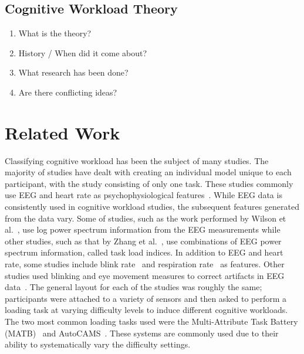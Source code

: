 \documentclass[11pt]{article}
\begin{document}
	\subsection{Cognitive Workload Theory}
	
		\begin{enumerate}
			\item What is the theory?
			\item History / When did it come about?
			\item What research has been done?
			\item Are there conflicting ideas?
		\end{enumerate}

\section{Related Work}
Classifying cognitive workload has been the subject of many studies. The majority of studies have dealt with creating an individual model unique to each participant, with the study consisting of only one task. These studies commonly use EEG and heart rate as psychophysiological features~\cite{Wang_R, Zhang, Wilson, Yang}. While EEG data is consistently used in cognitive workload studies, the subsequent features generated from the data vary. Some of studies, such as the work performed by Wilson et al.~\cite{Wilson}, use log power spectrum information from the EEG measurements while other studies, such as that by Zhang et al.~\cite{Zhang}, use combinations of EEG power spectrum information, called task load indices. In addition to EEG and heart rate, some studies include blink rate~\cite{Wilson, Wilson_2002} and respiration rate~\cite{Wilson_2003} as features. Other studies used blinking and eye movement measures to correct artifacts in EEG data~\cite{Wang_R}. The general layout for each of the studies was roughly the same; participants were attached to a variety of sensors and then asked to perform a loading task at varying difficulty levels to induce different cognitive workloads. The two most common loading tasks used were the Multi-Attribute Task Battery (MATB)~\cite{Comstock} and AutoCAMS~\cite{Lorenz}. These systems are commonly used due to their ability to systematically vary the difficulty settings. 
\end{document}

